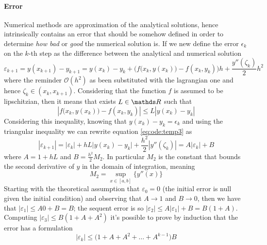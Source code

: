 	\paragraph{Error} Numerical methods are approximation of the analytical solutions, hence intrinsically contains an error that should be somehow defined in order to determine \textit{how bad} or \textit{good} the numerical solution is. If we new define the error $\epsilon_k$ on the $k$-th step as the difference between the analytical and numerical solution
	\begin{equation} \label{eq:ode:temp3}
		\varepsilon_{k+1}  = y(x_{k+1}) - y_{k+1} = y(x_k) - y_k + \Big( f\big(x_k, y(x_k)\big) - f(x_k,y_k) \Big) h + \frac{y''(\zeta_k)}{2} h^2 
	\end{equation}
	where the reminder $\mathcal O(h^2)$ as been substituted with the lagrangian one and hence $\zeta_k \in (x_k,x_{k+1})$. Considering that the function $f$ is assumed to be lipschitzian, then it means that exists $L\in \R$ such that
	\[ \left| f\big(x_k,y(x_k)\big) - f(x_k,y_k)\right| \leq L \left| y(x_k) - y_k \right|\]
	Considering this inequality, knowing that $y(x_k) - y_k = \epsilon_k$ and using the triangular inequality we can rewrite equation \ref{eq:ode:temp3} as
	\begin{equation}
		|\varepsilon_{k+1}| = |\varepsilon_k| + h L \big|y(x_k)-y_k\big| + \frac{h^2}{2} |y''(\zeta_k)| = A |\varepsilon_k| + B
	\end{equation}
	where $A = 1 + hL$ and $B = \frac{h^2}{2} M_2$. In particular $M_2$ is the constant that bounds the second derivative of $y$ in the domain of integration, meaning
	\[ M_2 = \sup_{x\in[a,b]} \{ y''(x) \} \]
	Starting with the theoretical assumption that $\varepsilon_0 = 0$ (the initial error is null given the initial condition) and observing that $A\rightarrow 1$ and $B\rightarrow 0$, then we have that $|\varepsilon_1| \leq A 0 + B = B$; the sequent error is so $|\varepsilon_2| \leq A |\varepsilon_1| + B = B(1+A)$. Computing $|\varepsilon_3| \leq B(1+A+A^2)$ it's possible to prove by induction that the error has a formulation
	\[ |\varepsilon_k| \leq \big(1 + A + A^2 + \dots + A^{k-1}\big) B \]
	
